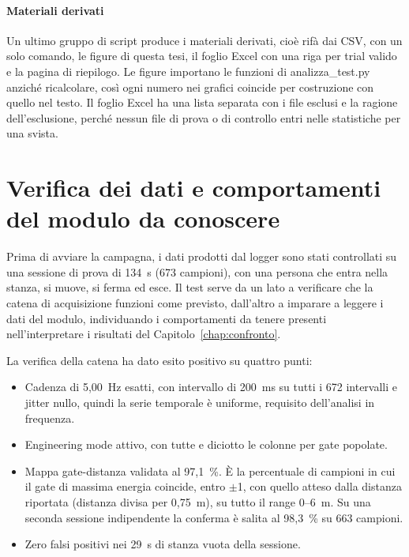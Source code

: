 \paragraph{Materiali derivati}

Un ultimo gruppo di script produce i materiali derivati, cioè rifà dai CSV, con un solo comando, le figure di questa tesi, il foglio Excel con una riga per trial valido e la pagina di riepilogo. Le figure importano le funzioni di analizza\_test.py anziché ricalcolare, così ogni numero nei grafici coincide per costruzione con quello nel testo. Il foglio Excel ha una lista separata con i file esclusi e la ragione dell'esclusione, perché nessun file di prova o di controllo entri nelle statistiche per una svista.

\FloatBarrier
\section{Verifica dei dati e comportamenti del modulo da conoscere}
\label{sec:c3-5}

Prima di avviare la campagna, i dati prodotti dal logger sono stati controllati su una sessione di prova di 134~s (673 campioni), con una persona che entra nella stanza, si muove, si ferma ed esce. Il test serve da un lato a verificare che la catena di acquisizione funzioni come previsto, dall'altro a imparare a leggere i dati del modulo, individuando i comportamenti da tenere presenti nell'interpretare i risultati del Capitolo~\ref{chap:confronto}.

La verifica della catena ha dato esito positivo su quattro punti:

\begin{itemize}
  \item Cadenza di 5,00~Hz esatti, con intervallo di 200~ms su tutti i 672 intervalli e jitter nullo, quindi la serie temporale è uniforme, requisito dell'analisi in frequenza.
  \item Engineering mode attivo, con tutte e diciotto le colonne per gate popolate.
  \item Mappa gate-distanza validata al 97,1~\%. È la percentuale di campioni in cui il gate di massima energia coincide, entro \(\pm\)1, con quello atteso dalla distanza riportata (distanza divisa per 0,75~m), su tutto il range 0--6~m. Su una seconda sessione indipendente la conferma è salita al 98,3~\% su 663 campioni.
  \item Zero falsi positivi nei 29~s di stanza vuota della sessione.
\end{itemize}

